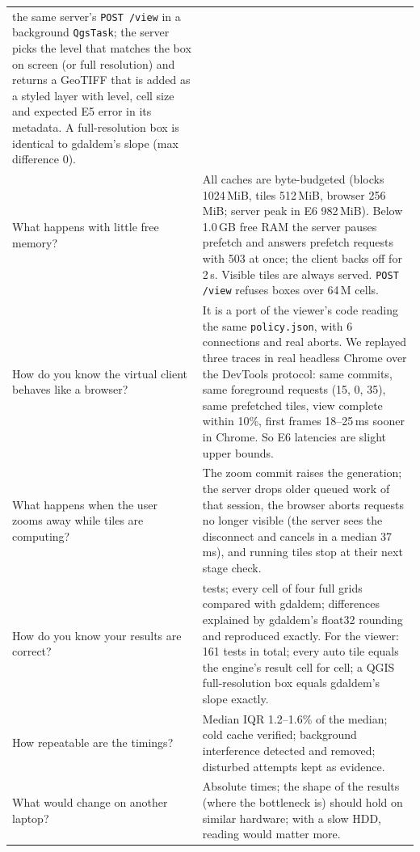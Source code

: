 ﻿\documentclass[11pt,a4paper]{article}
\newcommand{\code}[1]{\texttt{#1}}
\begin{document}
\begin{longtable}{>{\raggedright\arraybackslash}p{5.2cm}>{\raggedright\arraybackslash}p{10.2cm}}
the same server's \code{POST /view} in a background \code{QgsTask}; the server picks the level that matches the box on
screen (or full resolution) and returns a GeoTIFF that is added as a styled layer with level, cell size and expected E5
error in its metadata. A full-resolution box is identical to gdaldem's slope (max difference 0). \\
What happens with little free memory? & All caches are byte-budgeted (blocks 1024\,MiB, tiles 512\,MiB, browser 256\,MiB;
server peak in E6 982\,MiB). Below 1.0\,GB free RAM the server pauses prefetch and answers prefetch requests with 503 at
once; the client backs off for 2\,s. Visible tiles are always served. \code{POST /view} refuses boxes over 64\,M cells. \\
How do you know the virtual client behaves like a browser? & It is a port of the viewer's code reading the same
\code{policy.json}, with 6 connections and real aborts. We replayed three traces in real headless Chrome over the DevTools
protocol: same commits, same foreground requests (15, 0, 35), same prefetched tiles, view complete within 10\%, first
frames 18--25\,ms sooner in Chrome. So E6 latencies are slight upper bounds. \\
What happens when the user zooms away while tiles are computing? & The zoom commit raises the generation; the server
drops older queued work of that session, the browser aborts requests no longer visible (the server sees the disconnect
and cancels in a median 37\,ms), and running tiles stop at their next stage check. \\
How do you know your results are correct? & 119 tests; every cell of four full grids compared with gdaldem; differences explained
by gdaldem's float32 rounding and reproduced exactly. For the viewer: 161 tests in total; every auto tile equals the
engine's result cell for cell; a QGIS full-resolution box equals gdaldem's slope exactly. \\
How repeatable are the timings? & Median IQR 1.2--1.6\% of the median; cold cache verified; background interference detected and
removed; disturbed attempts kept as evidence. \\
What would change on another laptop? & Absolute times; the shape of the results (where the bottleneck is) should hold on similar
hardware; with a slow HDD, reading would matter more. \\
\bottomrule
\end{longtable}

\end{document}
